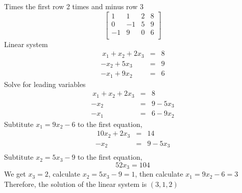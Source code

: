 \documentclass[a4paper,12pt]{report}
\begin{document}
Times the first row 2 times and minus row 3
\[
\begin{bmatrix}
    1       & 1 & 2 & 8 \\
    0       & -1 & 5  &9 \\
    -1       & 9 & 0  &6 \\
\end{bmatrix}
\]
Linear system
\begin{eqnarray*}
\ x_1 + x_2 +2x_3& = & 8\\
-x_2 + 5x_3 & = & 9\\
-x_1 +9x_2 & = & 6
\end{eqnarray*}
Solve for leading variables
\begin{eqnarray*}
\ x_1 + x_2 +2x_3& = & 8\\
-x_2 & = & 9 - 5x_3 \\
-x_1 & = & 6 - 9x_2 
\end{eqnarray*}
Subtitute \(x_1 = 9x_2 -6\) to the first equation,
\begin{eqnarray*}
\ 10x_2 +2x_3& = & 14\\
-x_2 & = & 9 - 5x_3 \\
\end{eqnarray*}
Subtitute \(x_2 = 5x_3-9\) to the first equation,
\[52x_3 =  104\]
We get \(x_3=2\), calculate \(x_2 = 5x_3-9 = 1\), then calculate \(x_1 = 9x_2 -6=3\)
Therefore, the solution of the linear system is \((3,1,2)\)
\begin{thebibliography}{9}

\end{thebibliography}
\end{document}
